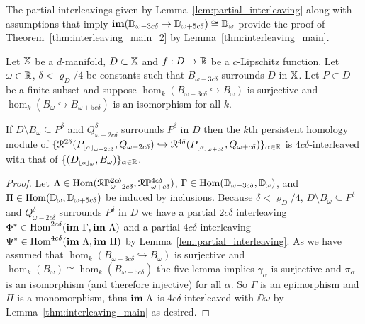 
The partial interleavings given by Lemma~\ref{lem:partial_interleaving} along with assumptions that imply $\mathbf{im}(\mathbb{D}_{\omega-3c\delta}\to \mathbb{D}_{\omega+5c\delta})\cong \mathbb{D}_{\omega}$ provide the proof of Theorem~\ref{thm:interleaving_main_2} by Lemma~\ref{thm:interleaving_main}.

\begin{theorem}\label{thm:interleaving_main_2}
  Let $\mathbb{X}$ be a $d$-manifold, $D\subset\mathbb{X}$ and $f : D\to\mathbb{R}$ be a $c$-Lipschitz function.
  Let $\omega\in\mathbb{R}$, $\delta < \varrho_D/4$ be constants such that $B_{\omega-3c\delta}$ surrounds $D$ in $\mathbb{X}$.
  Let $P\subset D$ be a finite subset and suppose $\hom_k(B_{\omega-3c\delta}\hookrightarrow B_\omega)$ is surjective and $\hom_k(B_\omega\hookrightarrow B_{\omega+5c\delta})$ is an isomorphism for all $k$.

  If $D\setminus B_\omega\subseteq P^\delta$ and $Q_{\omega-2c\delta}^\delta$ surrounds $P^\delta$ in $D$ then the $k$th persistent homology module of $\{\mathcal{R}^{2\delta}(P_{\scriptscriptstyle \lfloor\alpha\rfloor_{\omega-2c\delta}}, Q_{\omega-2c\delta})\hookrightarrow \mathcal{R}^{4\delta}(P_{\scriptscriptstyle \lfloor\alpha\rfloor_{\omega+c\delta}}, Q_{\omega+c\delta})\}_{\alpha\in\mathbb{R}}$ is $4c\delta$-interleaved with that of $\{(D_{\scriptscriptstyle \lfloor\alpha\rfloor_{\omega}}, B_\omega)\}_{\alpha\in\mathbb{R}}$.
\end{theorem}
\begin{proof}
  Let $\Lambda \in\mathrm{Hom}(\mathcal{R}\mathbb{P}_{\omega-2c\delta}^{2c\delta}, \mathcal{R}\mathbb{P}_{\omega+c\delta}^{4c\delta})$, $\Gamma\in\mathrm{Hom}(\mathbb{D}_{\omega-3c\delta}, \mathbb{D}_{\omega})$, and $\Pi\in\mathrm{Hom}(\mathbb{D}_{\omega},\mathbb{D}_{\omega+5c\delta})$ be induced by inclusions.
  Because $\delta < \varrho_D/4$, $D\setminus B_\omega\subseteq P^\delta$ and $Q_{\omega-2c\delta}^\delta$ surrounds $P^\delta$ in $D$ we have a partial $2c\delta$ interleaving $\Phi^*\in\mathrm{Hom}^{2c\delta}(\mathbf{im}~\Gamma, \mathbf{im}~\Lambda)$ and a partial $4c\delta$ interleaving $\Psi^*\in\mathrm{Hom}^{4c\delta}(\mathbf{im}~\Lambda, \mathbf{im}~\Pi)$ by Lemma~\ref{lem:partial_interleaving}.
  As we have assumed that $\hom_k(B_{\omega-3c\delta}\hookrightarrow B_\omega)$ is surjective and $\hom_k(B_\omega)\cong\hom_k(B_{\omega+5c\delta})$ the five-lemma implies $\gamma_\alpha$ is surjective and $\pi_\alpha$ is an isomorphism (and therefore injective) for all $\alpha$.
  So $\Gamma$ is an epimorphism and $\Pi$ is a monomorphism, thus $\mathbf{im}~\Lambda$ is $4c\delta$-interleaved with $\DD{\omega}$ by Lemma~\ref{thm:interleaving_main} as desired.
\end{proof}
